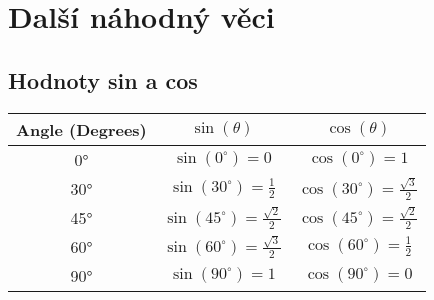 \section{Další náhodný věci}

\subsection*{Hodnoty sin a cos}

\begin{table}[ht]
	\centering
	\begin{tabular}{|c|c|c|}
		\hline
		Angle (Degrees) & $\sin(\theta)$ & $\cos(\theta)$ \\
		\hline \hline
		0° & $\sin(0^\circ) = 0$ & $\cos(0^\circ) = 1$ \\
		\hline
		30° & $\sin(30^\circ) = \frac{1}{2}$ & $\cos(30^\circ) = \frac{\sqrt{3}}{2}$ \\
		\hline
		45° & $\sin(45^\circ) = \frac{\sqrt{2}}{2}$ & $\cos(45^\circ) = \frac{\sqrt{2}}{2}$ \\
		\hline
		60° & $\sin(60^\circ) = \frac{\sqrt{3}}{2}$ & $\cos(60^\circ) = \frac{1}{2}$ \\
		\hline
		90° & $\sin(90^\circ) = 1$ & $\cos(90^\circ) = 0$ \\
		\hline
	\end{tabular}
\end{table}
